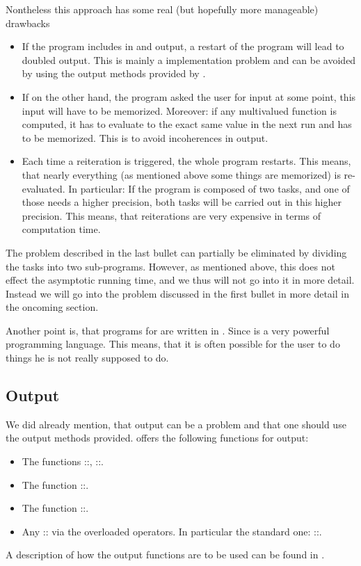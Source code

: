 Nontheless this approach has some real (but hopefully more manageable) drawbacks
\begin{itemize}
\item If the program includes in and output, a restart of the program will lead to doubled output. This is mainly a implementation problem and can be avoided by using the output methods provided by \irram.
\item If on the other hand, the program asked the user for input at some point, this input will have to be memorized. Moreover: if any multivalued function is computed, it has to evaluate to the exact same value in the next run and has to be memorized. This is to avoid incoherences in output.
\item Each time a reiteration is triggered, the whole program restarts. This means, that nearly everything (as mentioned above some things are memorized) is re-evaluated. In particular: If the program is composed of two tasks, and one of those needs a higher precision, both tasks will be carried out in this higher precision. This means, that reiterations are very expensive in terms of computation time.
\end{itemize}

The problem described in the last bullet can partially be eliminated by dividing the tasks into two sub-programs. However, as mentioned above, this does not effect the asymptotic running time, and we thus will not go into it in more detail. Instead we will go into the problem discussed in the first bullet in more detail in the oncoming section. 

Another point is, that programs for \irram are written in \cc. Since \cc is a very powerful programming language. This means, that it is often possible for the user to do things he is not really supposed to do.

\subsection{Output}

We did already mention, that output can be a problem and that one should use the output methods provided. \irram offers the following functions for output:
\begin{itemize}
\item The functions \irram::, \irram::.
\item The function \irram::.
\item The function \irram::.
\item Any \irram:: via the overloaded \ir{<<} operators. In particular the standard one: \irram::.
\end{itemize}
A description of how the output functions are to be used can be found in \cite[]{Muller2013}.

